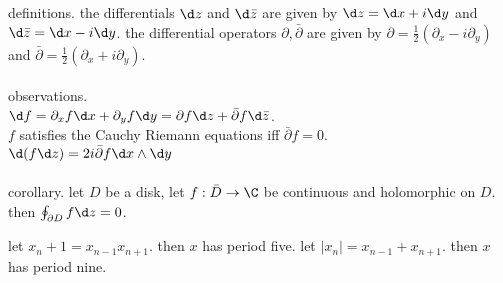 definitions. 
the differentials $\d z$ and $\d\bar z$ are given by $\d z = \d x+i\d y$ and $\d \bar z=\d x - i \d y$. 
the differential operators $\partial,\bar\partial$ are given by $\partial = \frac{1}{2}(\partial_x - i\partial_y)$ and $\bar\partial=\frac{1}{2}(\partial_x + i\partial_y)$.
\\
\\
observations. \\
$\d f=\partial_x f \d x+\partial_y f \d y = \partial f \d z + \bar\partial f \d\bar z$. \\
$f$ satisfies the Cauchy Riemann equations iff $\bar\partial f= 0$. \\
$\d (f \d z)=2i\bar\partial f \d x\wedge\d y$
\\
\\
corollary. let $D$ be a disk, let $f:\bar D\to \C$ be continuous and holomorphic on $D$. then $\oint_{\partial D} f\d z = 0$.



let $x_{n}+1 = x_{n-1}x_{n+1}$. then $x$ has period five.
let $|x_{n}|=x_{n-1}+x_{n+1}$. then $x$ has period nine.
